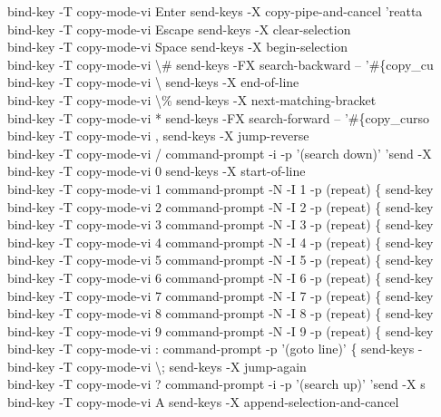 \documentclass[11pt,a4paper,twoside]{book}
\begin{document}
bind-key  -T copy-mode-vi Enter  send-keys -X copy-pipe-and-cancel 'reatta\\
bind-key  -T copy-mode-vi Escape  send-keys -X clear-selection\\
bind-key  -T copy-mode-vi Space  send-keys -X begin-selection\\
bind-key  -T copy-mode-vi \textbackslash{}\#  send-keys -FX search-backward -- '\#\{copy\_cu\\
bind-key  -T copy-mode-vi \textbackslash{}  send-keys -X end-of-line\\
bind-key  -T copy-mode-vi \textbackslash{}\%  send-keys -X next-matching-bracket\\
bind-key  -T copy-mode-vi *  send-keys -FX search-forward -- '\#\{copy\_curso\\
bind-key  -T copy-mode-vi ,  send-keys -X jump-reverse\\
bind-key  -T copy-mode-vi /  command-prompt -i -p '(search down)' 'send -X\\
bind-key  -T copy-mode-vi 0  send-keys -X start-of-line\\
bind-key  -T copy-mode-vi 1  command-prompt -N -I 1 -p (repeat) \{ send-key\\
bind-key  -T copy-mode-vi 2  command-prompt -N -I 2 -p (repeat) \{ send-key\\
bind-key  -T copy-mode-vi 3  command-prompt -N -I 3 -p (repeat) \{ send-key\\
bind-key  -T copy-mode-vi 4  command-prompt -N -I 4 -p (repeat) \{ send-key\\
bind-key  -T copy-mode-vi 5  command-prompt -N -I 5 -p (repeat) \{ send-key\\
bind-key  -T copy-mode-vi 6  command-prompt -N -I 6 -p (repeat) \{ send-key\\
bind-key  -T copy-mode-vi 7  command-prompt -N -I 7 -p (repeat) \{ send-key\\
bind-key  -T copy-mode-vi 8  command-prompt -N -I 8 -p (repeat) \{ send-key\\
bind-key  -T copy-mode-vi 9  command-prompt -N -I 9 -p (repeat) \{ send-key\\
bind-key  -T copy-mode-vi :  command-prompt -p '(goto line)' \{ send-keys -\\
bind-key  -T copy-mode-vi \textbackslash{};  send-keys -X jump-again\\
bind-key  -T copy-mode-vi ?  command-prompt -i -p '(search up)' 'send -X s\\
bind-key  -T copy-mode-vi A  send-keys -X append-selection-and-cancel\\
\end{document}
